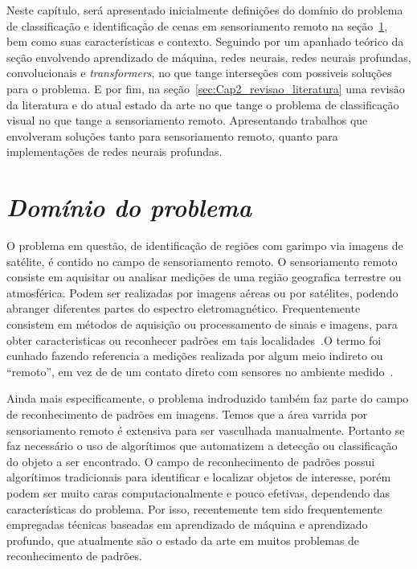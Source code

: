 Neste capítulo, será apresentado inicialmente definições do domínio do problema de classificação e identificação de cenas em sensoriamento remoto na seção~\ref{sec:Cap2_dominio}, bem como suas características e contexto. Seguindo por um apanhado teórico da seção envolvendo aprendizado de máquina, redes neurais, redes neurais profundas, convolucionais e \textit{transformers}, no que tange interseções com possiveis soluções para o problema. E por fim, na seção~\ref{sec:Cap2_revisao_literatura} uma revisão da literatura e do atual estado da arte no que tange o problema de classificação visual no que tange a sensoriamento remoto. Apresentando trabalhos que envolveram soluções tanto para sensoriamento remoto, quanto para implementações de redes neurais profundas.



\section{\textit{Domínio do problema}}\label{sec:Cap2_dominio}





O problema em questão, de identificação de regiões com garimpo via imagens de satélite, é contido no campo de sensoriamento remoto. O sensoriamento remoto consiste em aquisitar ou analisar medições de uma região geografica terrestre ou atmosférica. Podem ser realizadas por imagens aéreas ou por satélites, podendo abranger diferentes partes do espectro eletromagnético. Frequentemente consistem em métodos de aquisição ou processamento de sinais e imagens, para obter caracteristicas ou reconhecer padrões em tais localidades~\cite{emery2017introduction}.O termo foi cunhado fazendo referencia a medições realizada por algum meio indireto ou “remoto”, em vez de de um contato direto com sensores no ambiente medido~\cite{emery2017introduction}.

Ainda mais especificamente, o problema indroduzido também faz parte do campo de reconhecimento de padrões em imagens. Temos que a área varrida por sensoriamento remoto é extensiva para ser vasculhada manualmente. Portanto se faz necessário o uso de algorítimos que automatizem a detecção ou classificação do objeto a ser encontrado.
O campo de reconhecimento de padrões possui algorítimos tradicionais para identificar e localizar objetos de interesse, porém podem ser muito caras computacionalmente e pouco efetivas, dependendo das características do problema. Por isso, recentemente tem sido frequentemente empregadas técnicas baseadas em aprendizado de máquina e aprendizado profundo, que atualmente são o estado da arte em muitos problemas de reconhecimento de padrões.


